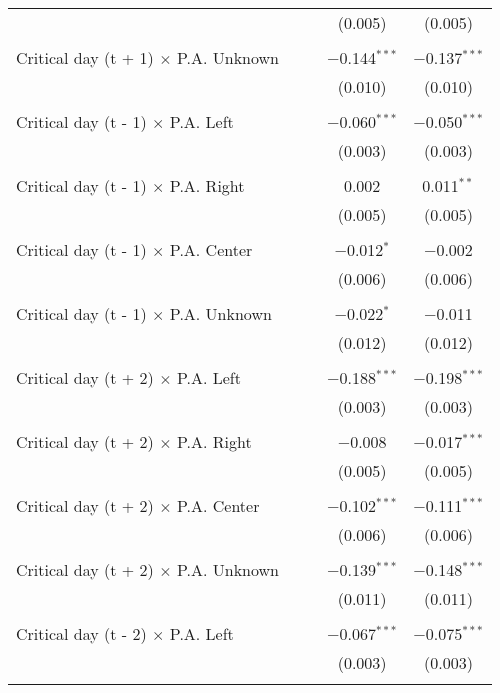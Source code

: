 \documentclass[
]{article}
\begin{document}
\begin{table}[!htbp]
{\begin{tabular}{@{\extracolsep{5pt}}lcccc}
  &  &  & (0.005) & (0.005) \\ 
  & & & & \\ 
 Critical day (t + 1) $\times$ P.A. Unknown &  &  & $-$0.144$^{***}$ & $-$0.137$^{***}$ \\ 
  &  &  & (0.010) & (0.010) \\ 
  & & & & \\ 
 Critical day (t - 1) $\times$ P.A. Left &  &  & $-$0.060$^{***}$ & $-$0.050$^{***}$ \\ 
  &  &  & (0.003) & (0.003) \\ 
  & & & & \\ 
 Critical day (t - 1) $\times$ P.A. Right &  &  & 0.002 & 0.011$^{**}$ \\ 
  &  &  & (0.005) & (0.005) \\ 
  & & & & \\ 
 Critical day (t - 1) $\times$ P.A. Center &  &  & $-$0.012$^{*}$ & $-$0.002 \\ 
  &  &  & (0.006) & (0.006) \\ 
  & & & & \\ 
 Critical day (t - 1) $\times$ P.A. Unknown &  &  & $-$0.022$^{*}$ & $-$0.011 \\ 
  &  &  & (0.012) & (0.012) \\ 
  & & & & \\ 
 Critical day (t + 2) $\times$ P.A. Left &  &  & $-$0.188$^{***}$ & $-$0.198$^{***}$ \\ 
  &  &  & (0.003) & (0.003) \\ 
  & & & & \\ 
 Critical day (t + 2) $\times$ P.A. Right &  &  & $-$0.008 & $-$0.017$^{***}$ \\ 
  &  &  & (0.005) & (0.005) \\ 
  & & & & \\ 
 Critical day (t + 2) $\times$ P.A. Center &  &  & $-$0.102$^{***}$ & $-$0.111$^{***}$ \\ 
  &  &  & (0.006) & (0.006) \\ 
  & & & & \\ 
 Critical day (t + 2) $\times$ P.A. Unknown &  &  & $-$0.139$^{***}$ & $-$0.148$^{***}$ \\ 
  &  &  & (0.011) & (0.011) \\ 
  & & & & \\ 
 Critical day (t - 2) $\times$ P.A. Left &  &  & $-$0.067$^{***}$ & $-$0.075$^{***}$ \\ 
  &  &  & (0.003) & (0.003) \\ 
  & & & & \\ 

\end{tabular}}
\end{table}
\end{document}
